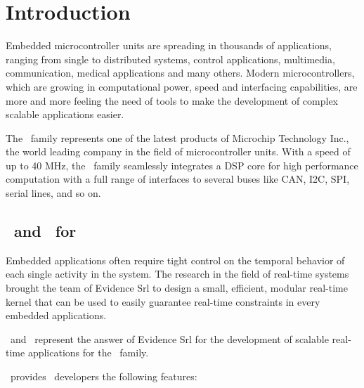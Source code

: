 \chapter[Introduction]{Introduction}
\label{cha:introduction}

Embedded microcontroller units are spreading in thousands of
applications, ranging from single to distributed systems, control
applications, multimedia, communication, medical applications and many
others. Modern microcontrollers, which are growing in computational
power, speed and interfacing capabilities, are more and more feeling
the need of tools to make the development of complex scalable
applications easier.

The \dspic\ family represents one of the latest products of Microchip
Technology Inc., the world leading company in the field of
microcontroller units. With a speed of up to 40 MHz, the \dspic\ family
seamlessly integrates a DSP core for high performance computation with
a full range of interfaces to several buses like CAN, I2C, SPI, serial
lines, and so on.  

\section{\ee\ and \rtd\ for \dspic}

Embedded applications often require tight control on the temporal
behavior of each single activity in the system. The research in the
field of real-time systems brought the team of Evidence Srl to design
a small, efficient, modular real-time kernel that can be used to
easily guarantee real-time constraints in every embedded applications.

\ee\ and \rtd\ represent the answer of Evidence Srl for the
development of scalable real-time applications for the \dspic\
family.

\ee\ provides \dspic\ developers the following features:

